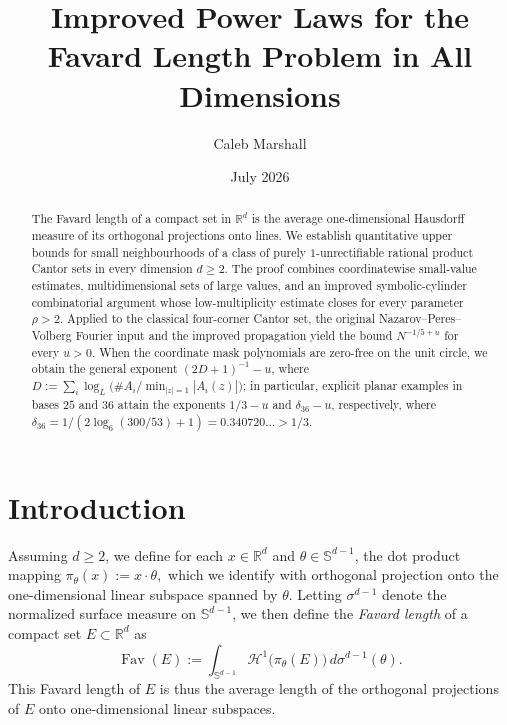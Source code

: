 \documentclass[12pt]{amsart}
\numberwithin{equation}{section}
\DeclareMathOperator{\Fav}{Fav}
\begin{document}
\author[C.~Marshall]{Caleb Marshall}
\address{Department of Mathematics \\ The University of Toronto, St. George Campus, Toronto, ON, Canada}


\date{July 2026}
\title[Improved Power Laws for Favard Length in All Dimensions]{Improved Power Laws for the Favard Length Problem in All Dimensions}

\begin{abstract}
The Favard length of a compact set in $\mathbb R^d$ is the average one-dimensional Hausdorff measure of its orthogonal projections onto lines.  We establish quantitative upper bounds for small neighbourhoods of a class of purely $1$-unrectifiable rational product Cantor sets in every dimension $d\geq2$.  The proof combines coordinatewise small-value estimates, multidimensional sets of large values, and an improved symbolic-cylinder combinatorial argument whose low-multiplicity estimate closes for every parameter $\rho>2$.  Applied to the classical four-corner Cantor set, the original Nazarov--Peres--Volberg Fourier input and the improved propagation yield the bound $N^{-1/5+u}$ for every $u>0$.  When the coordinate mask polynomials are zero-free on the unit circle, we obtain the general exponent $(2D+1)^{-1}-u$, where $D:=\sum_i\log_L\bigl(\#A_i/\min_{|z|=1}|A_i(z)|\bigr)$; in particular, explicit planar examples in bases $25$ and $36$ attain the exponents $1/3-u$ and $\delta_{36}-u$, respectively, where $\delta_{36}=1/(2\log_6(300/53)+1)=0.340720\ldots>1/3$.
\end{abstract}

\maketitle

\section{Introduction}
Assuming $d\geq 2$, we define for each $x \in \mathbb{R}^d$ and $\theta\in\mathbb{S}^{d-1}$, the dot product mapping
$
\pi_\theta(x):=x\cdot\theta,
$
which we identify with orthogonal projection onto the one-dimensional linear subspace spanned by $\theta$.  Letting $\sigma^{d-1}$ denote the normalized surface measure on $\mathbb{S}^{d-1}$, we then define the \emph{Favard length} of a compact set $E\subset\mathbb{R}^d$ as
\[
\Fav(E):=\int_{\mathbb{S}^{d-1}}\mathcal{H}^1\big(\pi_\theta(E)\big)\,d\sigma^{d-1}(\theta).
\]
This Favard length of $E$ is thus the average length of the orthogonal projections of $E$ onto one-dimensional linear subspaces.
\end{document}
